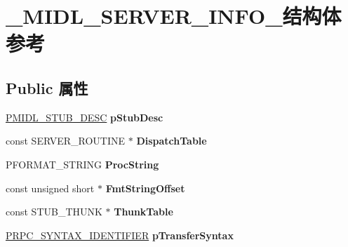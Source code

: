 \hypertarget{struct___m_i_d_l___s_e_r_v_e_r___i_n_f_o__}{}\section{\+\_\+\+M\+I\+D\+L\+\_\+\+S\+E\+R\+V\+E\+R\+\_\+\+I\+N\+F\+O\+\_\+结构体 参考}
\label{struct___m_i_d_l___s_e_r_v_e_r___i_n_f_o__}
\subsection*{Public 属性}
\begin{DoxyCompactItemize}
\item 
\mbox{\label{struct___m_i_d_l___s_e_r_v_e_r___i_n_f_o___ab9c417db055bdacd3ab3a0839f52de5f}} 
\hyperlink{struct___m_i_d_l___s_t_u_b___d_e_s_c}{P\+M\+I\+D\+L\+\_\+\+S\+T\+U\+B\+\_\+\+D\+E\+SC} {\bfseries p\+Stub\+Desc}
\item 
\mbox{\label{struct___m_i_d_l___s_e_r_v_e_r___i_n_f_o___a593b764221a2a59729849b465b151836}} 
const S\+E\+R\+V\+E\+R\+\_\+\+R\+O\+U\+T\+I\+NE $\ast$ {\bfseries Dispatch\+Table}
\item 
\mbox{\label{struct___m_i_d_l___s_e_r_v_e_r___i_n_f_o___ac9806dfd209d6935dba67b5bd05af3ef}} 
P\+F\+O\+R\+M\+A\+T\+\_\+\+S\+T\+R\+I\+NG {\bfseries Proc\+String}
\item 
\mbox{\label{struct___m_i_d_l___s_e_r_v_e_r___i_n_f_o___a2662e3dac954dbb8f52480b9acb30baa}} 
const unsigned short $\ast$ {\bfseries Fmt\+String\+Offset}
\item 
\mbox{\label{struct___m_i_d_l___s_e_r_v_e_r___i_n_f_o___a3e80d2ef5c8c860835cafe55df127848}} 
const S\+T\+U\+B\+\_\+\+T\+H\+U\+NK $\ast$ {\bfseries Thunk\+Table}
\item 
\mbox{\label{struct___m_i_d_l___s_e_r_v_e_r___i_n_f_o___aee8f64201a823eec8a3355a051d93bb6}} 
\hyperlink{struct___r_p_c___s_y_n_t_a_x___i_d_e_n_t_i_f_i_e_r}{P\+R\+P\+C\+\_\+\+S\+Y\+N\+T\+A\+X\+\_\+\+I\+D\+E\+N\+T\+I\+F\+I\+ER} {\bfseries p\+Transfer\+Syntax}

\end{DoxyCompactItemize}
